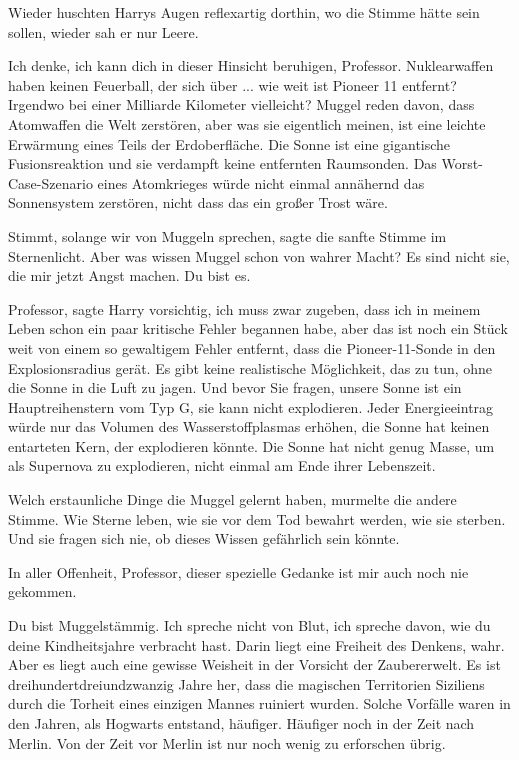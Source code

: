 Wieder huschten Harrys Augen reflexartig dorthin, wo die Stimme hätte sein
sollen, wieder sah er nur Leere.

\glqq Ich denke, ich kann dich in dieser Hinsicht beruhigen, Professor.
Nuklearwaffen haben keinen Feuerball, der sich über ... wie weit ist Pioneer 11
entfernt? Irgendwo bei einer Milliarde Kilometer vielleicht? Muggel reden davon,
dass Atomwaffen die Welt zerstören, aber was sie eigentlich meinen, ist eine
leichte Erwärmung eines Teils der Erdoberfläche. Die Sonne ist eine gigantische
Fusionsreaktion und sie verdampft keine entfernten Raumsonden. Das
Worst-Case-Szenario eines Atomkrieges würde nicht einmal annähernd das
Sonnensystem zerstören, nicht dass das ein großer Trost wäre.\grqq{}

\glqq Stimmt, solange wir von Muggeln sprechen\grqq{}, sagte die sanfte Stimme
im Sternenlicht. \glqq Aber was wissen Muggel schon von wahrer Macht? Es sind
nicht sie, die mir jetzt Angst machen. Du bist es.\grqq{}

\glqq Professor\grqq{}, sagte Harry vorsichtig, \glqq ich muss zwar zugeben,
dass ich in meinem Leben schon ein paar kritische Fehler begannen habe, aber das
ist noch ein Stück weit von einem so gewaltigem Fehler entfernt, dass die
Pioneer-11-Sonde in den Explosionsradius gerät. Es gibt keine realistische
Möglichkeit, das zu tun, ohne die Sonne in die Luft zu jagen. Und bevor Sie
fragen, unsere Sonne ist ein Hauptreihenstern vom Typ G, sie kann nicht
explodieren. Jeder Energieeintrag würde nur das Volumen des Wasserstoffplasmas
erhöhen, die Sonne hat keinen entarteten Kern, der explodieren könnte. Die Sonne
hat nicht genug Masse, um als Supernova zu explodieren, nicht einmal am Ende
ihrer Lebenszeit.\grqq{}

\glqq Welch erstaunliche Dinge die Muggel gelernt haben\grqq{}, murmelte die
andere Stimme. \glqq Wie Sterne leben, wie sie vor dem Tod bewahrt werden, wie
sie sterben. Und sie fragen sich nie, ob dieses Wissen gefährlich sein
könnte.\grqq{}

\glqq In aller Offenheit, Professor, dieser spezielle Gedanke ist mir auch noch
nie gekommen.\grqq{}

\glqq Du bist Muggelstämmig. Ich spreche nicht von Blut, ich spreche davon, wie
du deine Kindheitsjahre verbracht hast. Darin liegt eine Freiheit des Denkens,
wahr. Aber es liegt auch eine gewisse Weisheit in der Vorsicht der Zaubererwelt.
Es ist dreihundertdreiundzwanzig Jahre her, dass die magischen Territorien
Siziliens durch die Torheit eines einzigen Mannes ruiniert wurden. Solche
Vorfälle waren in den Jahren, als Hogwarts entstand, häufiger. Häufiger noch in
der Zeit nach Merlin. Von der Zeit vor Merlin ist nur noch wenig zu erforschen
übrig.\grqq{}

